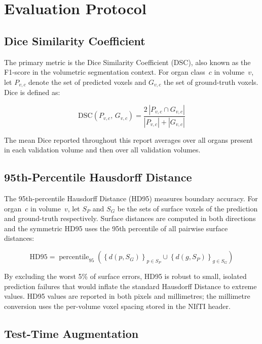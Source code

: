 \chapter{Evaluation Protocol}
\label{chap:eval}

\section{Dice Similarity Coefficient}

The primary metric is the Dice Similarity Coefficient (DSC), also known as the F1-score in the volumetric segmentation context. For organ class~$c$ in volume~$v$, let $P_{v,c}$ denote the set of predicted voxels and $G_{v,c}$ the set of ground-truth voxels. Dice is defined as:

\begin{equation}
  \mathrm{DSC}(P_{v,c},\, G_{v,c}) = \frac{2\,|P_{v,c} \cap G_{v,c}|}{|P_{v,c}| + |G_{v,c}|}
  \label{eq:dice}
\end{equation}

The mean Dice reported throughout this report averages over all organs present in each validation volume and then over all validation volumes.

\section{95th-Percentile Hausdorff Distance}

The 95th-percentile Hausdorff Distance (HD95) measures boundary accuracy. For organ~$c$ in volume~$v$, let $S_P$ and $S_G$ be the sets of surface voxels of the prediction and ground-truth respectively. Surface distances are computed in both directions and the symmetric HD95 uses the 95th percentile of all pairwise surface distances:

\begin{equation}
  \mathrm{HD95} = \operatorname{percentile}_{95}\!\left(
    \left\{d(p, S_G)\right\}_{p \in S_P} \cup
    \left\{d(g, S_P)\right\}_{g \in S_G}
  \right)
\end{equation}

By excluding the worst 5\% of surface errors, HD95 is robust to small, isolated prediction failures that would inflate the standard Hausdorff Distance to extreme values. HD95 values are reported in both pixels and millimetres; the millimetre conversion uses the per-volume voxel spacing stored in the NIfTI header.

\section{Test-Time Augmentation}

